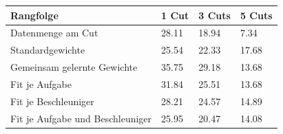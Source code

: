 \begin{tabular}{@{}llll@{}}
\toprule
Rangfolge & 1 Cut & 3 Cuts & 5 Cuts \\
\midrule
Datenmenge am Cut & 28.11 & 18.94 & 7.34 \\
Standardgewichte & 25.54 & 22.33 & 17.68 \\
Gemeinsam gelernte Gewichte & 35.75 & 29.18 & 13.68 \\
Fit je Aufgabe & 31.84 & 25.51 & 13.68 \\
Fit je Beschleuniger & 28.21 & 24.57 & 14.89 \\
Fit je Aufgabe und Beschleuniger & 25.95 & 20.47 & 14.08 \\
\bottomrule
\end{tabular}
